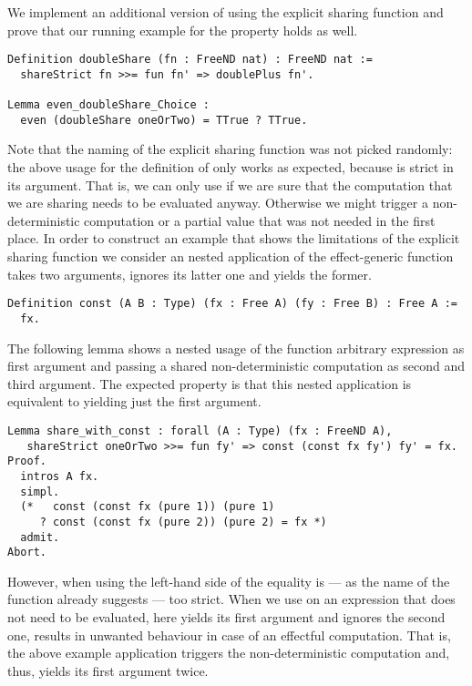 We implement an additional version of  using the explicit sharing function and prove that our running example for the property holds as well.

\begin{verbatim}
Definition doubleShare (fn : FreeND nat) : FreeND nat :=
  shareStrict fn >>= fun fn' => doublePlus fn'.

Lemma even_doubleShare_Choice :
  even (doubleShare oneOrTwo) = TTrue ? TTrue.
\end{verbatim}

Note that the naming of the explicit sharing function was not picked randomly: the above usage for the definition of  only works as expected, because  is strict in its argument.
That is, we can only use  if we are sure that the computation that we are sharing needs to be evaluated anyway.
Otherwise we might trigger a non-deterministic computation or a partial value that was not needed in the first place.
In order to construct an example that shows the limitations of the explicit sharing function we consider an nested application of the effect-generic function  takes two arguments, ignores its latter one and yields the former.

\begin{verbatim}
Definition const (A B : Type) (fx : Free A) (fy : Free B) : Free A :=
  fx.
\end{verbatim}

The following lemma shows a nested usage of the function  arbitrary expression as first argument and passing a shared non-deterministic computation as second and third argument.
The expected property is that this nested application is equivalent to yielding just the first argument.

\begin{verbatim}
Lemma share_with_const : forall (A : Type) (fx : FreeND A),
   shareStrict oneOrTwo >>= fun fy' => const (const fx fy') fy' = fx.
Proof.
  intros A fx.
  simpl.
  (*   const (const fx (pure 1)) (pure 1)
     ? const (const fx (pure 2)) (pure 2) = fx *)
  admit.
Abort.
\end{verbatim}

However, when using  the left-hand side of the equality is --- as the name of the function already suggests --- too strict.
When we use  on an expression that does not need to be evaluated, here  yields its first argument and ignores the second one, results in unwanted behaviour in case of an effectful computation.
That is, the above example application triggers the non-deterministic computation  and, thus, yields its first argument  twice.


